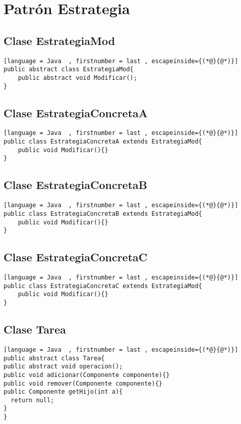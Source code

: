\section{Patrón Estrategia}

\subsection{Clase EstrategiaMod}
\begin{lstlisting}[language = Java  , firstnumber = last , escapeinside={(*@}{@*)}]
public abstract class EstrategiaMod{
	public abstract void Modificar();
}
\end{lstlisting}

\subsection{Clase EstrategiaConcretaA}
\begin{lstlisting}[language = Java  , firstnumber = last , escapeinside={(*@}{@*)}]
public class EstrategiaConcretaA extends EstrategiaMod{
	public void Modificar(){}
}
\end{lstlisting}

\subsection{Clase EstrategiaConcretaB}
\begin{lstlisting}[language = Java  , firstnumber = last , escapeinside={(*@}{@*)}]
public class EstrategiaConcretaB extends EstrategiaMod{
	public void Modificar(){}
}
\end{lstlisting}

\subsection{Clase EstrategiaConcretaC}
\begin{lstlisting}[language = Java  , firstnumber = last , escapeinside={(*@}{@*)}]
public class EstrategiaConcretaC extends EstrategiaMod{
	public void Modificar(){}
}
\end{lstlisting}

\subsection{Clase Tarea}
\begin{lstlisting}[language = Java  , firstnumber = last , escapeinside={(*@}{@*)}]
public abstract class Tarea{
public abstract void operacion();
public void adicionar(Componente componente){}
public void remover(Componente componente){}
public Componente getHijo(int a){
  return null;
}
}
\end{lstlisting}

